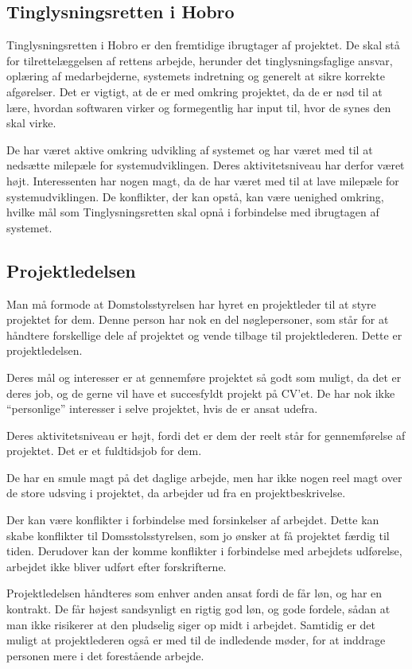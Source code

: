 \documentclass[10pt,a4paper,danish]{article}
\begin{document}
\subsection{Tinglysningsretten i Hobro}
Tinglysningsretten i Hobro er den fremtidige ibrugtager af projektet. De skal stå for tilrettelæggelsen af rettens arbejde, herunder det tinglysningsfaglige ansvar, oplæring af medarbejderne, systemets indretning og generelt at sikre korrekte afgørelser.
Det er vigtigt, at de er med omkring projektet, da de er nød til at lære, hvordan softwaren virker og formegentlig har input til, hvor de synes den skal virke.

De har været aktive omkring udvikling af systemet og har været med til at nedsætte milepæle for systemudviklingen. Deres aktivitetsniveau har derfor været højt.
Interessenten har nogen magt, da de har været med til at lave milepæle for systemudviklingen.
De konflikter, der kan opstå, kan være uenighed omkring, hvilke mål som Tinglysningsretten skal opnå i forbindelse med ibrugtagen af systemet.

\subsection{Projektledelsen}
Man må formode at Domstolsstyrelsen har hyret en projektleder til at styre projektet for dem. Denne person har nok en del nøglepersoner, som står for at håndtere forskellige dele af projektet og vende tilbage til projektlederen. Dette er projektledelsen.

Deres mål og interesser er at gennemføre projektet så godt som muligt, da det er deres job, og de gerne vil have et succesfyldt projekt på CV'et. De har nok ikke "`personlige"' interesser i selve projektet, hvis de er ansat udefra.

Deres aktivitetsniveau er højt, fordi det er dem der reelt står for gennemførelse af projektet. Det er et fuldtidsjob for dem.

De har en smule magt på det daglige arbejde, men har ikke nogen reel magt over de store udsving i projektet, da arbejder ud fra en projektbeskrivelse.

Der kan være konflikter i forbindelse med forsinkelser af arbejdet. Dette kan skabe konflikter til Domsstolsstyrelsen, som jo ønsker at få projektet færdig til tiden. Derudover kan der komme konflikter i forbindelse med arbejdets udførelse, arbejdet ikke bliver udført efter forskrifterne.

Projektledelsen håndteres som enhver anden ansat fordi de får løn, og har en kontrakt. De får højest sandsynligt en rigtig god løn, og gode fordele, sådan at man ikke risikerer at den pludselig siger op midt i arbejdet. Samtidig er det muligt at projektlederen også er med til de indledende møder, for at inddrage personen mere i det forestående arbejde.
\end{document}
